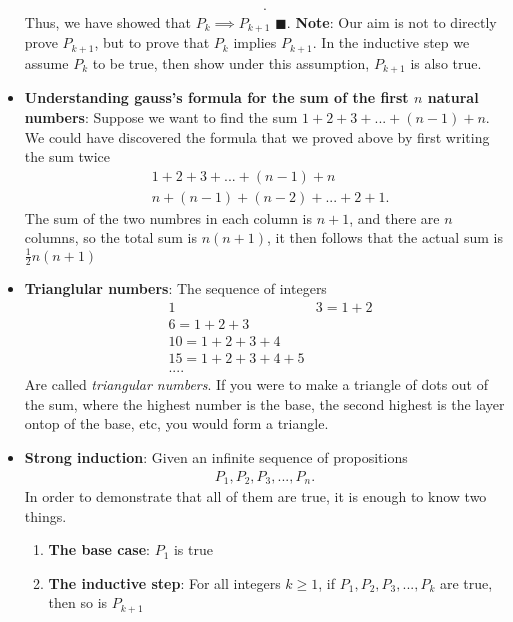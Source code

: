 \documentclass{report}
\begin{document}
\begin{itemize}
\begin{align*}
            .\end{align*}
            Thus, we have showed that $P_{k} \implies P_{k+1}$ $\blacksquare$.
            \bigbreak \noindent 
            \textbf{Note}: Our aim is not to directly prove $P_{k+1}$, but to prove that $P_{k}$ implies $P_{k+1}$. In the inductive step we assume $P_{k}$ to be true, then show under this assumption, $P_{k+1}$ is also true.
        \item \textbf{Understanding gauss's formula for the sum of the first $n$ natural numbers}: Suppose we want to find the sum $1+2+3+...+(n-1)+n$. We could have discovered the formula that we proved above by first writing the sum twice
            \begin{align*}
                &1 + 2  + 3 + ... + (n-1) + n \\
                &n + (n-1) + (n-2) + ... + 2 + 1
            .\end{align*}
            The sum of the two numbres in each column is $n+1$, and there are $n$ columns, so the total sum is $n(n+1)$, it then follows that the actual sum is $\frac{1}{2}n(n+1)$
        \item \textbf{Trianglular numbers}: The sequence of integers
            \begin{align*}
                &1
                &3 = 1+2 \\
                &6 = 1 + 2  + 3 \\
                &10 = 1 + 2 + 3 + 4 \\
                &15  = 1 + 2 + 3 + 4 + 5  \\
                &...
            .\end{align*}
            Are called \textit{triangular numbers}. If you were to make a triangle of dots out of the sum, where the highest number is the base, the second highest is the layer ontop of the base, etc, you would form a triangle.
        \item \textbf{Strong induction}: Given an infinite sequence of propositions
            \begin{align*}
                P_{1}, P_{2}, P_{3}, ..., P_{n}
            .\end{align*}
            In order to demonstrate that all of them are true, it is enough to know two things.
            \begin{enumerate}
                \item \textbf{The base case}: $P_{1}$ is true
                \item \textbf{The inductive step}: For all integers $k \geq 1$, if $P_{1}, P_{2}, P_{3},...,P_{k}$ are true, then so is $P_{k+1}$

\end{enumerate}
\end{itemize}
\end{document}

